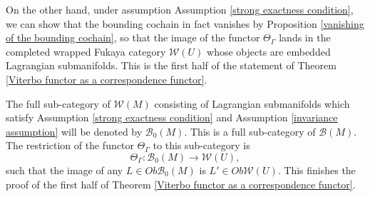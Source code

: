\documentclass{amsart}
\numberwithin{equation}{section}
\numberwithin{figure}{section}
\begin{document}
	On the other hand, under assumption Assumption \ref{strong exactness condition}, we can show that the bounding cochain in fact vanishes by Proposition \ref{vanishing of the bounding cochain}, so that the image of the functor $\Theta_{\Gamma}$ lands in the completed wrapped Fukaya category $\mathcal{W}(U)$ whose objects are embedded Lagrangian submanifolds. This is the first half of the statement of Theorem \ref{Viterbo functor as a correspondence functor}. \par
	The full sub-category of $\mathcal{W}(M)$ consisting of Lagrangian submanifolds which satisfy Assumption \ref{strong exactness condition} and Assumption \ref{invariance assumption} will be denoted by $\mathcal{B}_{0}(M)$. This is a full sub-category of $\mathcal{B}(M)$. The restriction of the functor $\Theta_{\Gamma}$ to this sub-category is
\begin{equation}
\Theta_{\Gamma}: \mathcal{B}_{0}(M) \to \mathcal{W}(U),
\end{equation}
such that the image of any $L \in Ob \mathcal{B}_{0}(M)$ is $L' \in Ob \mathcal{W}(U)$. This finishes the proof of the first half of Theorem \ref{Viterbo functor as a correspondence functor}. \par
\end{document}
